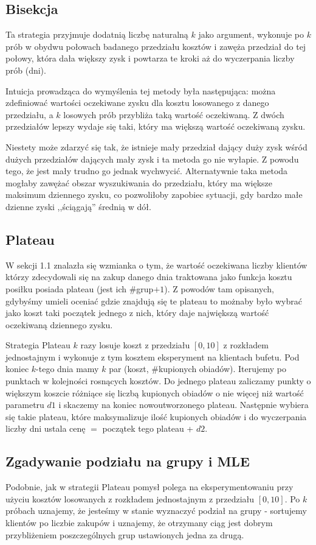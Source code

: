 \documentclass[a4paper,11pt]{article}
\begin{document}
\subsection{Bisekcja}
Ta strategia przyjmuje dodatnią liczbę naturalną $k$ jako argument, wykonuje po $k$ prób w
obydwu połowach badanego przedziału kosztów i zawęża przedział do tej połowy, która
dała większy zysk i powtarza te kroki aż do wyczerpania liczby prób (dni).

Intuicja prowadząca do wymyślenia tej metody była następująca:
można zdefiniować wartości oczekiwane zysku dla kosztu losowanego z danego przedziału, a
$k$ losowych prób przybliża taką wartość oczekiwaną. Z dwóch przedziałów lepszy wydaje
się taki, który ma większą wartość oczekiwaną zysku.

Niestety może zdarzyć się tak, że istnieje mały przedział dający duży zysk wśród
dużych przedziałów dających mały zysk i ta metoda go nie wyłapie. Z powodu tego,
że jest mały trudno go jednak wychwycić. Alternatywnie taka metoda mogłaby zawężać
obszar wyszukiwania do przedziału, który ma większe maksimum dziennego zysku, co
pozwoliłoby zapobiec sytuacji, gdy bardzo małe dzienne zyski ,,ściągają'' średnią w dół.

\subsection{Plateau}
W sekcji 1.1 znalazła się wzmianka o tym, że wartość oczekiwana liczby klientów którzy zdecydowali się na zakup danego dnia traktowana jako funkcja kosztu posiłku posiada
plateau (jest ich $\#$grup$+ 1$). Z powodów tam opisanych, gdybyśmy umieli oceniać
gdzie znajdują się te plateau to możnaby było wybrać jako koszt taki początek jednego
z nich, który daje największą wartość oczekiwaną dziennego zysku.

Strategia Plateau $k$ razy losuje koszt z przedziału $[0, 10]$ z rozkładem jednostajnym
i wykonuje z tym kosztem eksperyment na klientach bufetu. Pod koniec $k$-tego dnia mamy 
$k$ par (koszt, $\#$kupionych obiadów). Iterujemy po punktach w kolejności rosnących
kosztów. Do jednego plateau zaliczamy punkty o większym koszcie różniące się liczbą
kupionych obiadów o nie więcej niż wartość parametru $d1$ i skaczemy na koniec nowoutworzonego plateau. Następnie wybiera się takie plateau, które maksymalizuje ilość
kupionych obiadów i do wyczerpania liczby dni ustala cenę $=$ początek tego plateau + $d2$.

\subsection{Zgadywanie podziału na grupy i MLE}
Podobnie, jak w strategii Plateau pomysł polega na eksperymentowaniu przy użyciu
kosztów losowanych z rozkładem jednostajnym z przedziału $[0, 10]$. Po $k$ próbach
uznajemy, że jesteśmy w stanie wyznaczyć podział na grupy - sortujemy klientów po
liczbie zakupów i uznajemy, że otrzymany ciąg jest dobrym przybliżeniem poszczególnych grup
ustawionych jedna za drugą.
\end{document}
